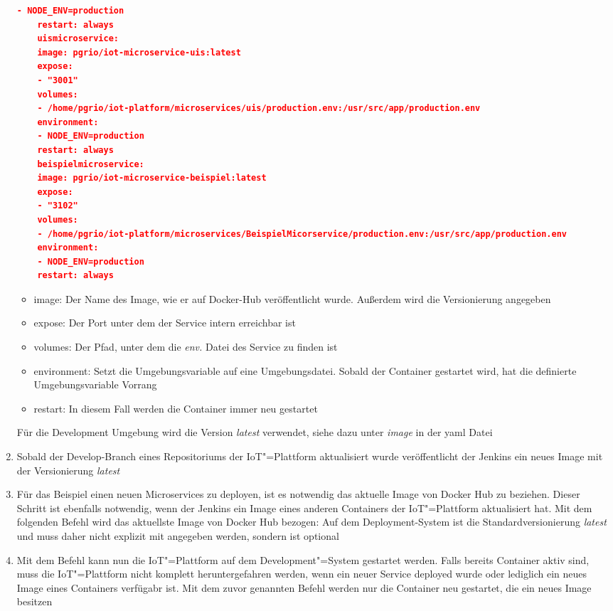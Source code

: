 \begin{enumerate}
\begin{lstlisting}[language=json]
	- NODE_ENV=production
	restart: always
	uismicroservice:
	image: pgrio/iot-microservice-uis:latest
	expose:
	- "3001"
	volumes:
	- /home/pgrio/iot-platform/microservices/uis/production.env:/usr/src/app/production.env
	environment:
	- NODE_ENV=production
	restart: always
	beispielmicroservice:
	image: pgrio/iot-microservice-beispiel:latest
	expose:
	- "3102"
	volumes:
	- /home/pgrio/iot-platform/microservices/BeispielMicorservice/production.env:/usr/src/app/production.env
	environment:
	- NODE_ENV=production
	restart: always
	\end{lstlisting}
	\begin{itemize}
		\item image: Der Name des Image, wie er auf Docker-Hub veröffentlicht wurde. Außerdem wird die Versionierung angegeben
		\item expose: Der Port unter dem der Service intern erreichbar ist
		\item volumes: Der Pfad, unter dem die \textit{env.} Datei des Service zu finden ist
		\item environment: Setzt die Umgebungsvariable auf eine Umgebungsdatei. Sobald der Container gestartet wird, hat die definierte Umgebungsvariable Vorrang
		\item restart: In diesem Fall werden die Container immer neu gestartet
	\end{itemize}
	Für die Development Umgebung wird die Version \textit{latest} verwendet, siehe dazu unter \textit{image} in der yaml Datei
	\item Sobald der Develop-Branch eines Repositoriums der IoT"=Plattform aktualisiert wurde veröffentlicht der Jenkins ein neues Image mit der Versionierung \textit{latest}
	\item Für das Beispiel einen neuen Microservices zu deployen, ist es notwendig das aktuelle Image von Docker Hub zu beziehen. Dieser Schritt ist ebenfalls notwendig, wenn der Jenkins ein Image eines anderen Containers der IoT"=Plattform aktualisiert hat. Mit dem folgenden Befehl wird das aktuellste Image von Docker Hub bezogen: \newline
	Auf dem Deployment-System ist die Standardversionierung \textit{latest} und muss daher nicht explizit mit angegeben werden, sondern ist optional
	\item Mit dem Befehl  kann nun die IoT"=Plattform auf dem Development"=System gestartet werden. \newline
	Falls bereits Container aktiv sind, muss die IoT"=Plattform nicht komplett heruntergefahren werden, wenn ein neuer Service deployed wurde oder lediglich ein neues Image eines Containers verfügabr ist. Mit dem zuvor genannten Befehl werden nur die Container neu gestartet, die ein neues Image besitzen
\end{enumerate}

